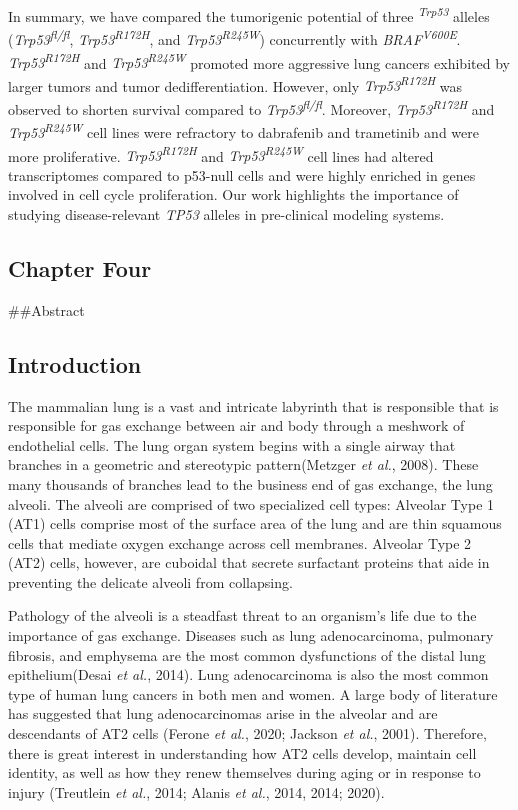 In summary, we have compared the tumorigenic potential of three \emph{\textsuperscript{Trp53}} alleles (\emph{Trp53\textsuperscript{fl/fl}}, \emph{Trp53\textsuperscript{R172H}}, and \emph{Trp53\textsuperscript{R245W}}) concurrently with \emph{BRAF\textsuperscript{V600E}}. \emph{Trp53\textsuperscript{R172H}} and \emph{Trp53\textsuperscript{R245W}} promoted more aggressive lung cancers exhibited by larger tumors and tumor dedifferentiation. However, only \emph{Trp53\textsuperscript{R172H}} was observed to shorten survival compared to \emph{Trp53\textsuperscript{fl/fl}}. Moreover, \emph{Trp53\textsuperscript{R172H}} and \emph{Trp53\textsuperscript{R245W}} cell lines were refractory to dabrafenib and trametinib and were more proliferative. \emph{Trp53\textsuperscript{R172H}} and \emph{Trp53\textsuperscript{R245W}} cell lines had altered transcriptomes compared to p53-null cells and were highly enriched in genes involved in cell cycle proliferation. Our work highlights the importance of studying disease-relevant \emph{TP53} alleles in pre-clinical modeling systems.

\hypertarget{chapter-four}{%
\subsection{Chapter Four}\label{chapter-four}}

\#\#Abstract

\hypertarget{introduction-2}{%
\subsection{Introduction}\label{introduction-2}}

The mammalian lung is a vast and intricate labyrinth that is responsible that is responsible for gas exchange between air and body through a meshwork of endothelial cells. The lung organ system begins with a single airway that branches in a geometric and stereotypic pattern(Metzger \emph{et al.}, 2008). These many thousands of branches lead to the business end of gas exchange, the lung alveoli. The alveoli are comprised of two specialized cell types: Alveolar Type 1 (AT1) cells comprise most of the surface area of the lung and are thin squamous cells that mediate oxygen exchange across cell membranes. Alveolar Type 2 (AT2) cells, however, are cuboidal that secrete surfactant proteins that aide in preventing the delicate alveoli from collapsing.

Pathology of the alveoli is a steadfast threat to an organism's life due to the importance of gas exchange. Diseases such as lung adenocarcinoma, pulmonary fibrosis, and emphysema are the most common dysfunctions of the distal lung epithelium(Desai \emph{et al.}, 2014). Lung adenocarcinoma is also the most common type of human lung cancers in both men and women. A large body of literature has suggested that lung adenocarcinomas arise in the alveolar and are descendants of AT2 cells (Ferone \emph{et al.}, 2020; Jackson \emph{et al.}, 2001). Therefore, there is great interest in understanding how AT2 cells develop, maintain cell identity, as well as how they renew themselves during aging or in response to injury (Treutlein \emph{et al.}, 2014; Alanis \emph{et al.}, 2014, 2014; 2020).

